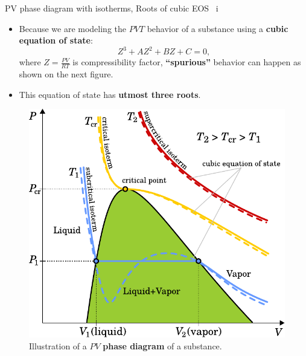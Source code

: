\begin{frame}{PV phase diagram with isotherms, Roots of cubic EOS \, i}

\lcol
\begin{itemize}
\item Because we are modeling the $PVT$ behavior of a substance
using a \alert{\bf cubic equation of state}:
\[
Z^{3}+AZ^{2}+BZ+C=0,
\]
where $Z=\frac{PV}{RT}$ is compressibility factor, 
\textbf{“spurious”} behavior can happen as shown on the next figure.
\item This equation of state has \textbf{utmost three roots}. 
\end{itemize}
\rcol

\begin{figure}
\centering 
\includegraphics[width=1\textwidth]{figures/activity-models/phase-diagram-pv-cubic-eos}
\caption{\footnotesize Illustration of a $PV$ \textbf{phase diagram} of a substance.}
\end{figure}
\ecol
\end{frame}
%
